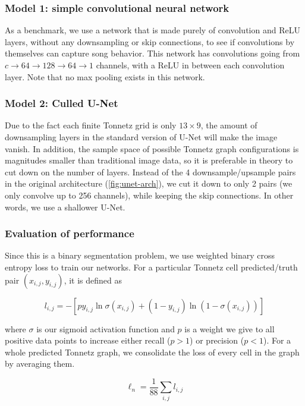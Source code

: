 \documentclass[
	a4paper, %
	10pt, %
	unnumberedsections, %
	twoside, %
]{LTJournalArticle}
\begin{document}
\subsubsection{Model 1: simple convolutional neural network}

As a benchmark, we use a network that is made purely of convolution and ReLU layers, without any downsampling or skip connections, to see if convolutions by themselves can capture song behavior. This network has convolutions going from $c\to64\to128\to64\to1$ channels, with a ReLU in between each convolution layer. Note that no max pooling exists in this network.

\subsubsection{Model 2: Culled U-Net}

Due to the fact each finite Tonnetz grid is only $13\times9$, the amount of downsampling layers in the standard version of U-Net will make the image vanish. In addition, the sample space of possible Tonnetz graph configurations is magnitudes smaller than traditional image data, so it is preferable in theory to cut down on the number of layers. Instead of the 4 downsample/upsample pairs in the original architecture (\autoref{fig:unet-arch}), we cut it down to only 2 pairs (we only convolve up to 256 channels), while keeping the skip connections. In other words, we use a shallower U-Net.

\subsubsection{Evaluation of performance}

Since this is a binary segmentation problem, we use weighted binary cross entropy loss to train our networks. For a particular Tonnetz cell predicted/truth pair $(x_{i,j},y_{i,j})$, it is defined as

\begin{equation}
    l_{i,j} = -[py_{i,j}\ln\sigma(x_{i,j}) + (1-y_{i,j})\ln(1-\sigma(x_{i,j}))]
\end{equation}

where $\sigma$ is our sigmoid activation function and $p$ is a weight we give to all positive data points to increase either recall ($p>1$) or precision ($p<1$). For a whole predicted Tonnetz graph, we consolidate the loss of every cell in the graph by averaging them.

\begin{equation}
\ell_n = \frac{1}{88}\sum_{i,j}l_{i,j}
\end{equation}
\end{document}
